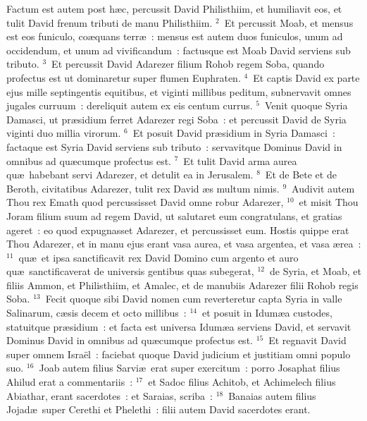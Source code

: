 \lettrine[lines=3,image=true,loversize=0.05,lraise=-0.03]{F}{}actum est autem post h\ae c, percussit David Philisthiim, et humiliavit eos, et tulit David frenum tributi de manu Philisthiim.
${}^{2}$~Et percussit Moab, et mensus est eos funiculo, co\ae quans terr\ae~: mensus est autem duos funiculos, unum ad occidendum, et unum ad vivificandum~: factusque est Moab David serviens sub tributo.
${}^{3}$~Et percussit David Adarezer filium Rohob regem Soba, quando profectus est ut dominaretur super flumen Euphraten.
${}^{4}$~Et captis David ex parte ejus mille septingentis equitibus, et viginti millibus peditum, subnervavit omnes jugales curruum~: dereliquit autem ex eis centum currus.
${}^{5}$~Venit quoque Syria Damasci, ut pr\ae sidium ferret Adarezer regi Soba~: et percussit David de Syria viginti duo millia virorum.
${}^{6}$~Et posuit David pr\ae sidium in Syria Damasci~: factaque est Syria David serviens sub tributo~: servavitque Dominus David in omnibus ad qu\ae cumque profectus est.
${}^{7}$~Et tulit David arma aurea qu\ae\ habebant servi Adarezer, et detulit ea in Jerusalem.
${}^{8}$~Et de Bete et de Beroth, civitatibus Adarezer, tulit rex David \ae s multum nimis.
${}^{9}$~Audivit autem Thou rex Emath quod percussisset David omne robur Adarezer,
${}^{10}$~et misit Thou Joram filium suum ad regem David, ut salutaret eum congratulans, et gratias ageret~: eo quod expugnasset Adarezer, et percussisset eum. Hostis quippe erat Thou Adarezer, et in manu ejus erant vasa aurea, et vasa argentea, et vasa \ae rea~:
${}^{11}$~qu\ae\ et ipsa sanctificavit rex David Domino cum argento et auro qu\ae\ sanctificaverat de universis gentibus quas subegerat,
${}^{12}$~de Syria, et Moab, et filiis Ammon, et Philisthiim, et Amalec, et de manubiis Adarezer filii Rohob regis Soba.
${}^{13}$~Fecit quoque sibi David nomen cum reverteretur capta Syria in valle Salinarum, c\ae sis decem et octo millibus~:
${}^{14}$~et posuit in Idum\ae a custodes, statuitque pr\ae sidium~: et facta est universa Idum\ae a serviens David, et servavit Dominus David in omnibus ad qu\ae cumque profectus est.
${}^{15}$~Et regnavit David super omnem Isra\"el~: faciebat quoque David judicium et justitiam omni populo suo.
${}^{16}$~Joab autem filius Sarvi\ae\ erat super exercitum~: porro Josaphat filius Ahilud erat a commentariis~:
${}^{17}$~et Sadoc filius Achitob, et Achimelech filius Abiathar, erant sacerdotes~: et Saraias, scriba~:
${}^{18}$~Banaias autem filius Jojad\ae\ super Cerethi et Phelethi~: filii autem David sacerdotes erant.

